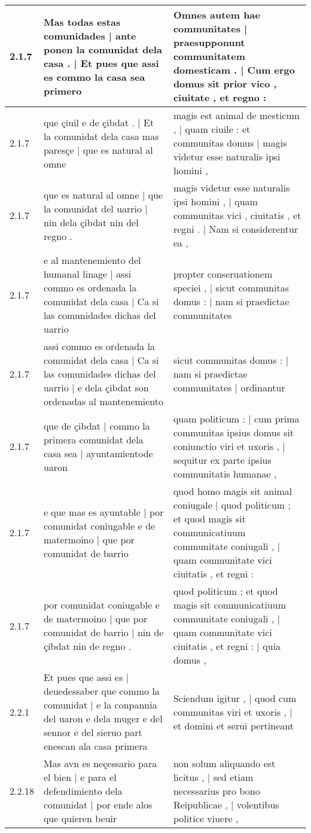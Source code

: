 \begin{tabular}{|p{1cm}|p{6.5cm}|p{6.5cm}|}
2.1.7 & Mas todas estas comunidades | ante ponen la comunidat dela casa . | Et pues que assi es commo la casa sea primero & Omnes autem hae communitates | praesupponunt communitatem domesticam . | Cum ergo domus sit prior vico , ciuitate , et regno : \\\hline
2.1.7 & que çiuil e de çibdat . | Et la comunidat dela casa mas paresçe | que es natural al omne & magis est animal de mesticum , | quam ciuile : et communitas domus | magis videtur esse naturalis ipsi homini , \\\hline
2.1.7 & que es natural al omne | que la comunidat del uarrio | nin dela çibdat nin del regno . & magis videtur esse naturalis ipsi homini , | quam communitas vici , ciuitatis , et regni . | Nam si considerentur ea , \\\hline
2.1.7 & e al mantenemiento del humanal linage | assi commo es ordenada la comunidat dela casa | Ca si las comunidades dichas del uarrio & propter conseruationem speciei , | sicut communitas domus : | nam si praedictae communitates \\\hline
2.1.7 & assi commo es ordenada la comunidat dela casa | Ca si las comunidades dichas del uarrio | e dela çibdat son ordenadas al mantenemiento & sicut communitas domus : | nam si praedictae communitates | ordinantur \\\hline
2.1.7 & que de çibdat | commo la primera comunidat dela casa sea | ayuntamientode uaron & quam politicum : | cum prima communitas ipsius domus sit coniunctio viri et uxoris , | sequitur ex parte ipsius communitatis humanae , \\\hline
2.1.7 & e que mas es ayuntable | por comunidat coniugable e de matermoino | que por comunidat de barrio & quod homo magis sit animal coniugale | quod politicum ; et quod magis sit communicatiuum communitate coniugali , | quam communitate vici ciuitatis , et regni : \\\hline
2.1.7 & por comunidat coniugable e de matermoino | que por comunidat de barrio | nin de çibdat nin de regno . & quod politicum ; et quod magis sit communicatiuum communitate coniugali , | quam communitate vici ciuitatis , et regni : | quia domus , \\\hline
2.2.1 & Et pues que assi es | deuedessaber que commo la comunidat | e la conpannia del uaron e dela muger e del sennor e del sieruo part enescan ala casa primera & Sciendum igitur , | quod cum communitas viri et uxoris , | et domini et serui pertineant \\\hline
2.2.18 & Mas avn es neçessario para el bien | e para el defendimiento dela comunidat | por ende alos que quieren beuir & non solum aliquando est licitus , | sed etiam necessarius pro bono Reipublicae , | volentibus politice viuere , \\\hline

\end{tabular}
